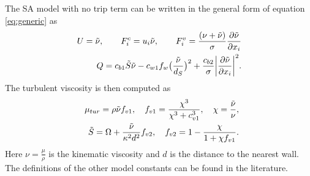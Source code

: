 \noindent The SA model\cite{spalart1992one} with no trip term can be written in the general form of equation \ref{eq:generic} as 
\begin{align}
    U= \Tilde{\nu}, \qquad
    F^c_i = u_i \Tilde{\nu}, \qquad
    F^v_i = \frac{(\nu + \Tilde{\nu})}{\sigma}\frac{\partial \Tilde{\nu}}{\partial x_i} \nonumber \\
    Q =  c_{b1}\Tilde{S}\Tilde{\nu} -c_{w1}f_w\big(\frac{\Tilde{\nu}}{d_S} \big)^2 + \frac{c_{b2}}{\sigma}\bigg|\frac{\partial \Tilde{\nu}}{\partial x_i}\bigg|^2.
    \label{eq:SAmodel}
\end{align}{}
The turbulent viscosity is then computed as
\begin{eqnarray*}
    \mu_{tur} = \rho \Tilde{\nu} f_{v1},\quad f_{v1} = \frac{\chi^3}{\chi^3 + c_{v1}^3}, \quad \chi = \frac{\Tilde{\nu}}{\nu},\\
    \quad \Tilde{S}= \Omega+\frac{\Tilde{\nu}}{\kappa^2 d^2}f_{v2}, \quad f_{v2}=1-\frac{\chi}{1+\chi f_{v1}}.
\end{eqnarray*}
Here $\nu = \frac{\mu}{\rho}$ is the kinematic viscosity and $d$ is the distance to the nearest wall. The definitions of the other model constants can be found in the literature\cite{spalart2000trends,spalart1992one}.

